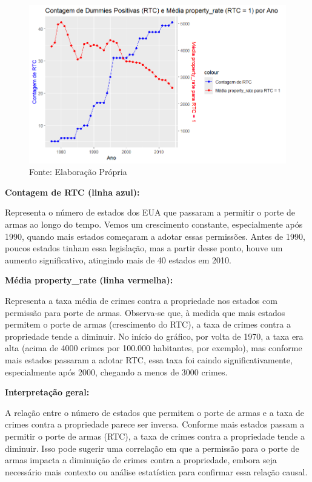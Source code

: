 \documentclass[12pt]{article}
\begin{document}
\begin{figure}[H]
    \centering
    \includegraphics[width=1\linewidth]{grafico1final.png}
    \caption{Fonte: Elaboração Própria}
    \label{fig:enter-label}
\end{figure}




\textbf{Contagem de RTC (linha azul):}

Representa o número de estados dos EUA que passaram a permitir o porte
de armas ao longo do tempo. Vemos um crescimento constante,
especialmente após 1990, quando mais estados começaram a adotar essas
permissões. Antes de 1990, poucos estados tinham essa legislação, mas a
partir desse ponto, houve um aumento significativo, atingindo mais de 40
estados em 2010.

\textbf{Média property\_rate (linha vermelha):}

Representa a taxa média de crimes contra a propriedade nos estados com
permissão para porte de armas. Observa-se que, à medida que mais estados
permitem o porte de armas (crescimento do RTC), a taxa de crimes contra
a propriedade tende a diminuir. No início do gráfico, por volta de 1970,
a taxa era alta (acima de 4000 crimes por 100.000 habitantes, por
exemplo), mas conforme mais estados passaram a adotar RTC, essa taxa foi
caindo significativamente, especialmente após 2000, chegando a menos de
3000 crimes.

\textbf{Interpretação geral:}

A relação entre o número de estados que permitem o porte de armas e a
taxa de crimes contra a propriedade parece ser inversa. Conforme mais
estados passam a permitir o porte de armas (RTC), a taxa de crimes
contra a propriedade tende a diminuir. Isso pode sugerir uma correlação
em que a permissão para o porte de armas impacta a diminuição de crimes
contra a propriedade, embora seja necessário mais contexto ou análise
estatística para confirmar essa relação causal.
\end{document}

